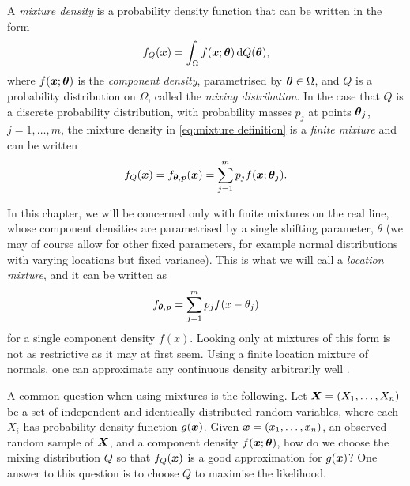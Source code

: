 
	A \emph{mixture density} is a probability density function that can be written in the form
	\begin{equation}
		f_Q({\bm{{x}}}) = \int_\Omega f({\bm{{x}}}; {\bm{{\theta}}}) \, \mathrm{d} Q({\bm{{\theta}}}),
		\label{eq:mixture definition}
	\end{equation}
	where $f({\bm{{x}}};{\bm{{\theta}}})$ is the \emph{component density}, parametrised by ${\bm{{\theta}}} \in \Omega$, and $Q$ is a probability distribution on $\Omega$, called the \emph{mixing distribution}. In the case that $Q$ is a discrete probability distribution, with probability masses $p_j$ at points ${\bm{{\theta}}}_j$, $j = 1, \dots, m$, the mixture density in \eqref{eq:mixture definition} is a \emph{finite mixture} and can be written
	\begin{equation}
		f_Q({\bm{{x}}}) = f_{{\bm{{\theta}}}, {\bm{{p}}}}({\bm{{x}}}) = \sum_{j = 1}^m p_j f({\bm{{x}}}; {\bm{{\theta}}}_j).
	\end{equation}

	In this chapter, we will be concerned only with finite mixtures on the real line, whose component densities are parametrised by a single shifting parameter, $\theta$ (we may of course allow for other fixed parameters, for example normal distributions with varying locations but fixed variance). This is what we will call a \emph{location mixture}, and it can be written as
	\begin{equation}
		f_{{\bm{{\theta}}}, {\bm{{p}}}} = \sum_{j = 1}^m p_j f(x - \theta_j)
		\label{eq:location mixture}
	\end{equation}
	for a single component density $f(x)$.
	Looking only at mixtures of this form is not as restrictive as it may at first seem. Using a finite location mixture of normals, one can approximate any continuous density arbitrarily well \cite{Nguyen2019-qx}.

	A common question when using mixtures is the following. Let ${\bm{{X}}} = (X_1, \dots, X_n)$ be a set of independent and identically distributed random variables, where each $X_i$ has probability density function $g({\bm{{x}}})$. Given ${\bm{{x}}} = (x_1, \dots, x_n)$, an observed random sample of ${\bm{{X}}}$, and a component density $f({\bm{{x}}}; {\bm{{\theta}}})$, how do we choose the mixing distribution $Q$ so that $f_Q({\bm{{x}}})$ is a good approximation for $g({\bm{{x}}})$?	One answer to this question is to choose $Q$ to maximise the likelihood.

